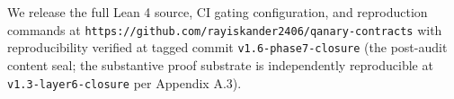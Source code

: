 We release the full Lean 4 source, CI gating configuration, and
reproduction commands at
\texttt{https://github.com/rayiskander2406/qanary-contracts} with
reproducibility verified at tagged commit \texttt{v1.6-phase7-closure}
(the post-audit content seal; the substantive proof substrate is
independently reproducible at \texttt{v1.3-layer6-closure} per Appendix
A.3).
